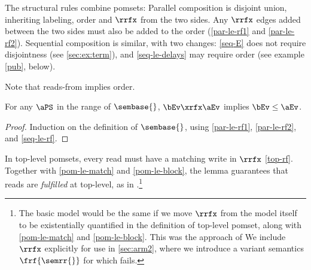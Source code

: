The structural rules combine pomsets:  Parallel composition is disjoint
union, inheriting labeling, order and $\rrfx$ from the two sides.  Any
$\rrfx$ edges added between the two sides must also be added to the order
(\ref{par-le-rf1} and \ref{par-le-rf2}).
% 
Sequential composition is similar, with two changes: \ref{seq-E} does not
require disjointness (see \textsection\ref{sec:ex:term}), and
\ref{seq-le-delays} may require order (see example \ref{pub}, below).

Note that reads-from implies order.
\begin{lemma}
  \label{lem:rf:implies:le}
  For any $\aPS$ in the range of $\sembase{}$, $\bEv\xrfx\aEv$ implies
  $\bEv\le\aEv$.

  \vspace{-.5\baselineskip}
  \begin{proof}
    Induction on the definition of $\sembase{}$, using \ref{par-le-rf1}, \ref{par-le-rf2}, and \ref{seq-le-rf}.
  \end{proof}
\end{lemma}
In top-level pomsets, every read must have a matching write in $\rrfx$
\eqref{top-rf}.  Together with \ref{pom-le-match} and \ref{pom-le-block}, the lemma
guarantees that reads are \emph{fulfilled} at top-level, as in
\cite[]{DBLP:journals/pacmpl/JagadeesanJR20}.\footnote{The
  basic model would be the same if we move $\rrfx$ from the model itself to
  be existentially quantified in the definition of top-level pomset, along
  with \ref{pom-le-match} and \ref{pom-le-block}.  This was the approach of
  \citeauthor{DBLP:journals/pacmpl/JagadeesanJR20} We include $\rrfx$
  explicitly for use in \textsection\ref{sec:arm2}, where we introduce a
  variant semantics $\frf{\semrr{}}$ for which 
  fails.}

